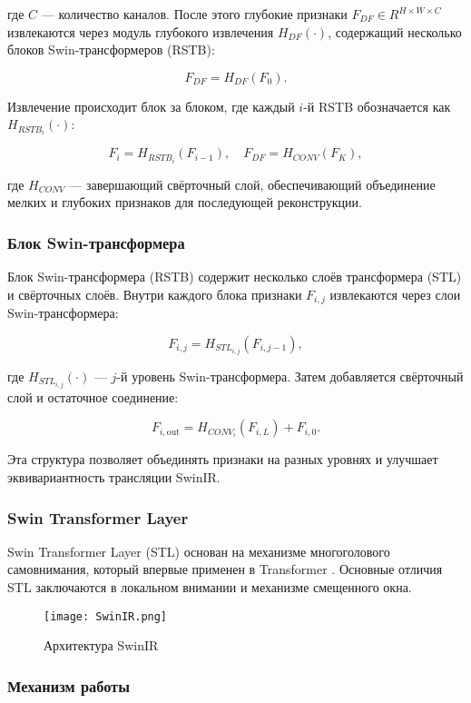 \documentclass[14pt]{extarticle}
\begin{document}
где $C$ — количество каналов. После этого глубокие признаки $F_{DF} \in R^{H \times W \times C}$ извлекаются через модуль глубокого извлечения $H_{DF}(\cdot)$, содержащий несколько блоков Swin-трансформеров (RSTB):

$$
    F_{DF} = H_{DF}(F_0).
$$

Извлечение происходит блок за блоком, где каждый $i$-й RSTB обозначается как $H_{RSTB_i}(\cdot)$:

$$
    F_i = H_{RSTB_i}(F_{i-1}), \quad F_{DF} = H_{CONV}(F_K),
$$

где $H_{CONV}$ — завершающий свёрточный слой, обеспечивающий объединение мелких и глубоких признаков для последующей реконструкции.


\subsubsection{Блок Swin-трансформера}

Блок Swin-трансформера (RSTB) содержит несколько слоёв трансформера (STL) и свёрточных слоёв. Внутри каждого блока признаки $F_{i,j}$ извлекаются через слои Swin-трансформера:

$$
    F_{i,j} = H_{STL_{i,j}}(F_{i,j-1}),
$$

где $H_{STL_{i,j}}(\cdot)$ — $j$-й уровень Swin-трансформера. Затем добавляется свёрточный слой и остаточное соединение:

$$
    F_{i,\text{out}} = H_{CONV_i}(F_{i,L}) + F_{i,0}.
$$

Эта структура позволяет объединять признаки на разных уровнях и улучшает эквивариантность трансляции SwinIR.

\subsubsection{Swin Transformer Layer}
Swin Transformer Layer (STL) \cite{liu2021swintransformerhierarchicalvision} основан на механизме многоголового самовнимания, который впервые применен в Transformer \cite{vaswani2017attentionneed}. Основные отличия STL заключаются в локальном внимании и механизме смещенного окна.

\begin{figure}
    \centering
    \texttt{[image: SwinIR.png]}
    \caption{Архитектура SwinIR}
    \label{fig:SwinIR}
\end{figure}

\subsubsection{Механизм работы}
\end{document}

